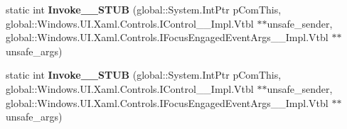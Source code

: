 \begin{DoxyCompactItemize}
static int {\bfseries Invoke\+\_\+\+\_\+\+S\+T\+UB} (global\+::\+System.\+Int\+Ptr p\+Com\+This, global\+::\+Windows.\+U\+I.\+Xaml.\+Controls.\+I\+Control\+\_\+\+\_\+\+Impl.\+Vtbl $\ast$$\ast$unsafe\+\_\+sender, global\+::\+Windows.\+U\+I.\+Xaml.\+Controls.\+I\+Focus\+Engaged\+Event\+Args\+\_\+\+\_\+\+Impl.\+Vtbl $\ast$$\ast$unsafe\+\_\+args)
\item 
\mbox{\label{struct_windows_1_1_foundation_1_1_typed_event_handler___a___windows___u_i___xaml___controls___cobd4a24aa41f7e9787f0e1d263ab457b2_a0d5780a73342005ac8a32aeebbb40fab}} 
static int {\bfseries Invoke\+\_\+\+\_\+\+S\+T\+UB} (global\+::\+System.\+Int\+Ptr p\+Com\+This, global\+::\+Windows.\+U\+I.\+Xaml.\+Controls.\+I\+Control\+\_\+\+\_\+\+Impl.\+Vtbl $\ast$$\ast$unsafe\+\_\+sender, global\+::\+Windows.\+U\+I.\+Xaml.\+Controls.\+I\+Focus\+Engaged\+Event\+Args\+\_\+\+\_\+\+Impl.\+Vtbl $\ast$$\ast$unsafe\+\_\+args)
\end{DoxyCompactItemize}
